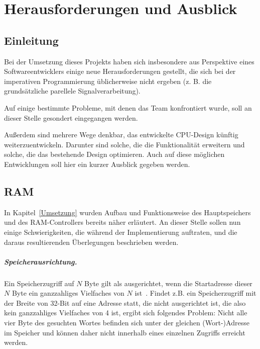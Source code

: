 \chapter{Herausforderungen und Ausblick} %
\label{Probleme} %

\section{Einleitung}

Bei der Umsetzung dieses Projekts haben sich insbesondere aus Perspektive eines Softwareentwicklers einige neue Herausforderungen gestellt, die sich bei der imperativen Programmierung üblicherweise nicht ergeben (z. B. die grundsätzliche parellele Signalverarbeitung).

Auf einige bestimmte Probleme, mit denen das Team konfrontiert wurde, soll an dieser Stelle gesondert eingegangen werden.

Außerdem sind mehrere Wege denkbar, das entwickelte CPU-Design künftig weiterzuentwickeln. Darunter sind solche, die die Funktionalität erweitern und solche, die das bestehende Design optimieren. Auch auf diese möglichen Entwicklungen soll hier ein kurzer Ausblick gegeben werden.

\section{RAM}

In Kapitel~\ref{Umsetzung} wurden Aufbau und Funktionsweise des Hauptspeichers und des RAM-Controllers bereits näher erläutert.
An dieser Stelle sollen nun einige Schwierigkeiten, die während der Implementierung auftraten, und die daraus resultierenden Überlegungen beschrieben werden.

\paragraph{Speicherausrichtung.} 
Ein Speicherzugriff auf $N$ Byte gilt als ausgerichtet, wenn die Startadresse dieser $N$ Byte ein ganzzahliges Vielfaches von $N$ ist~\cite[S. 96/97]{Hennessy}.
Findet z.B. ein Speicherzugriff mit der Breite von 32-Bit auf eine Adresse statt, die nicht ausgerichtet ist, die also kein ganzzahliges Vielfaches von 4 ist, ergibt sich folgendes Problem:
Nicht alle vier Byte des gesuchten Wortes befinden sich unter der gleichen (Wort-)Adresse im Speicher und können daher nicht innerhalb eines einzelnen Zugriffs erreicht werden.

